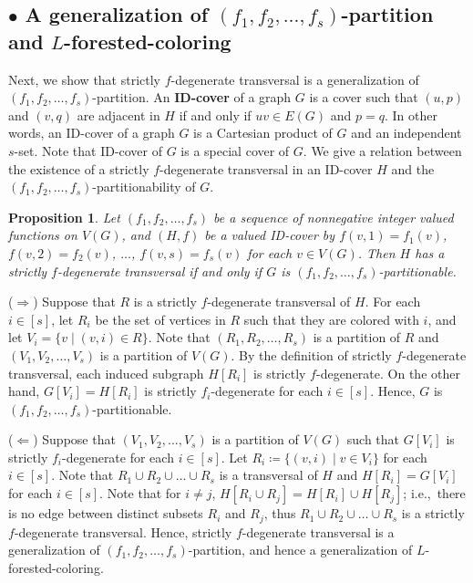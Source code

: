 \documentclass{article}
\makeatletter
\renewenvironment{proof}[1][\proofname]{\par
  \pushQED{\qed}%
  \normalfont \topsep6\p@\@plus6\p@\relax
  \trivlist
  \item[\hskip\labelsep
        \bfseries
    #1\@addpunct{.}]\ignorespaces
}{%
  \popQED\endtrivlist\@endpefalse
}
\newtheorem{proposition}{Proposition}
\theoremstyle{definition}
\newcommand{\ie}{i.e.,\ }
\makeatother
\begin{document}
 
\subsection*{$\bullet$ A generalization of $(f_{1}, f_{2}, \dots, f_{s})$-partition and $L$-forested-coloring}
Next, we show that strictly $f$-degenerate transversal is a generalization of $(f_{1}, f_{2}, \dots, f_{s})$-partition. An \textbf{ID-cover} of a graph $G$ is a cover such that $(u, p)$ and $(v, q)$ are adjacent in $H$ if and only if $uv \in E(G)$ and $p = q$. In other words, an ID-cover of a graph $G$ is a Cartesian product of $G$ and an independent $s$-set. Note that ID-cover of $G$ is a special cover of $G$. We give a relation between the existence of a strictly $f$-degenerate transversal in an ID-cover $H$ and the $(f_{1}, f_{2}, \dots, f_{s})$-partitionability of $G$. 

\begin{proposition}
Let $(f_{1}, f_{2}, \dots, f_{s})$ be a sequence of nonnegative integer valued functions on $V(G)$, and $(H, f)$ be a valued ID-cover by $f(v, 1) = f_{1}(v)$, $f(v, 2) = f_{2}(v)$, $\dots$, $f(v, s) = f_{s}(v)$ for each $v \in V(G)$. Then $H$ has a strictly $f$-degenerate transversal if and only if $G$ is $(f_{1}, f_{2}, \dots, f_{s})$-partitionable.  
\end{proposition}
\begin{proof}
($\Longrightarrow$) Suppose that $R$ is a strictly $f$-degenerate transversal of $H$. For each $i \in [s]$, let $R_{i}$ be the set of vertices in $R$ such that they are colored with $i$, and let $V_{i} = \{v \mid (v, i) \in R\}$. Note that $(R_{1}, R_{2}, \dots, R_{s})$ is a partition of $R$ and $(V_{1}, V_{2}, \dots, V_{s})$ is a partition of $V(G)$. By the definition of strictly $f$-degenerate transversal, each induced subgraph $H[R_{i}]$ is strictly $f$-degenerate. On the other hand, $G[V_{i}] = H[R_{i}]$ is strictly $f_{i}$-degenerate for each $i \in [s]$. Hence, $G$ is $(f_{1}, f_{2}, \dots, f_{s})$-partitionable. 

($\Longleftarrow$) Suppose that $(V_{1}, V_{2}, \dots, V_{s})$ is a partition of $V(G)$ such that $G[V_{i}]$ is strictly $f_{i}$-degenerate for each $i \in [s]$. Let $R_{i} \coloneqq \{(v, i) \mid v \in V_{i}\}$ for each $i \in [s]$. Note that $R_{1} \cup R_{2} \cup \dots \cup R_{s}$ is a transversal of $H$ and $H[R_{i}] = G[V_{i}]$ for each $i \in [s]$. Note that for $i \neq j$, $H[R_{i} \cup R_{j}] = H[R_{i}] \cup H[R_{j}]$; \ie there is no edge between distinct subsets $R_{i}$ and $R_{j}$, thus $R_{1} \cup R_{2} \cup \dots \cup R_{s}$ is a strictly $f$-degenerate transversal. 
\end{proof}
Hence, strictly $f$-degenerate transversal is a generalization of $(f_{1}, f_{2}, \dots, f_{s})$-partition, and hence a generalization of $L$-forested-coloring. 
\end{document}
